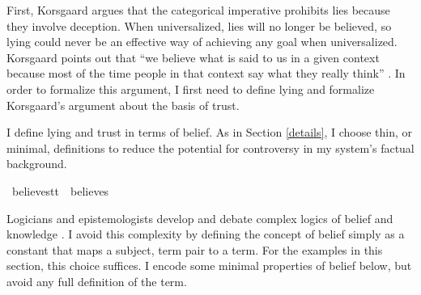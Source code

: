 \begin{isabellebody}
\begin{isamarkuptext}
First, Korsgaard argues that the categorical imperative prohibits lies because they involve deception. 
When universalized, lies will no longer be believed, so lying could never be an effective way of achieving 
any goal when universalized. Korsgaard points out that ``we believe what is said to us in a given 
context because most of the time people in that context say what they really think'' \citep[4]{KorsgaardRTL}. 
In order to formalize this argument, I first need to define lying and formalize Korsgaard's argument 
about the basis of trust.

I define lying and trust in terms of belief. As in Section \ref{details}, I choose thin, or minimal,
definitions to reduce the potential for controversy in my system's factual background.%
\end{isamarkuptext}\isamarkuptrue%
\isamarkupfalse%
\ believe{\isacharcolon}{\isacharcolon}{\isachardoublequoteopen}s{\isasymRightarrow}t{\isasymRightarrow}t{\isachardoublequoteclose}\ {\isacharparenleft}{\isachardoublequoteopen}{\isacharunderscore}\ believes\ {\isacharunderscore}{\isachardoublequoteclose}{\isacharparenright}\isanewline
%
%
\begin{isamarkuptext}%
Logicians and epistemologists develop and debate complex logics of belief and knowledge \citep{seplogicbelief}. 
I avoid this complexity by defining the concept of belief simply as a constant that maps a subject, term pair 
to a term. For the examples in this section, this choice suffices. 
I encode some minimal properties of belief below, but avoid any full definition of the term. 


\end{isamarkuptext}
\end{isabellebody}

